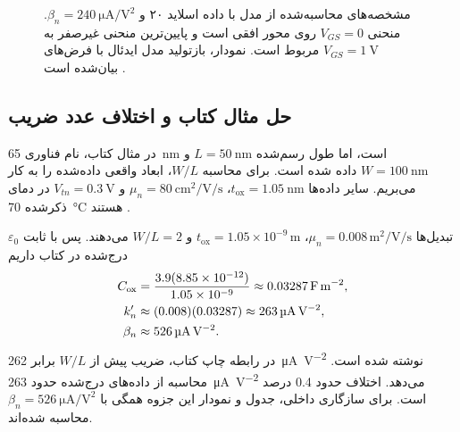 \begin{figure}[ht]
\centering
\begin{latin}
\PersianMathDigits
{}
\end{latin}
\caption{مشخصه‌های محاسبه‌شده از مدل  با داده اسلاید ۲۰ و
\(\beta_n=\qty{240}{\micro\ampere\per\volt\squared}\). منحنی \(V_{GS}=0\)
روی محور افقی است و پایین‌ترین منحنی غیرصفر به \(V_{GS}=\qty{1}{\volt}\) مربوط است.
نمودار، بازتولید مدل ایدئال با فرض‌های بیان‌شده است \cite{mos}.}
\label{fig:mos-slide-curves}
\end{figure}

\subsection{حل مثال \texorpdfstring{}{۲.۱} کتاب و اختلاف عدد ضریب}
در مثال  کتاب، نام فناوری \qty{65}{\nano\metre} است، اما طول رسم‌شده
\(L=\qty{50}{\nano\metre}\) و \(W=\qty{100}{\nano\metre}\) داده شده است.
برای محاسبه \(W/L\)، ابعاد واقعی داده‌شده را به کار می‌بریم. سایر داده‌ها
\(t_{\mathrm{ox}}=\qty{1.05}{\nano\metre}\)،
\(\mu_n=\qty{80}{\centi\metre\squared\per\volt\per\second}\) و
\(V_{tn}=\qty{0.3}{\volt}\) در دمای ذکرشده \qty{70}{\degreeCelsius} هستند
\cite[صفحه ۶۷]{weste}.

تبدیل‌ها \(\mu_n=0.008\,\unit{\metre\squared\per\volt\per\second}\)،
\(t_{\mathrm{ox}}=1.05\times10^{-9}\,\unit{\metre}\) و \(W/L=2\) می‌دهند.
پس با ثابت \(\varepsilon_0\) درج‌شده در کتاب داریم
\begin{align}
 C_{\mathrm{ox}}&=\frac{3.9(8.85\times10^{-12})}{1.05\times10^{-9}}
 \approx0.03287\,\unit{\farad\per\metre\squared},\notag\\
 k'_n&\approx(0.008)(0.03287)
 \approx\qty{263}{\micro\ampere\per\volt\squared},\notag\\
 \beta_n&\approx\qty{526}{\micro\ampere\per\volt\squared}.
 \label{eq:mos-book-beta}
\end{align}
در رابطه  چاپ کتاب، ضریب پیش از \(W/L\) برابر
\qty{262}{\micro\ampere\per\volt\squared} نوشته شده است.
محاسبه از داده‌های درج‌شده حدود \qty{263}{\micro\ampere\per\volt\squared}
می‌دهد. اختلاف حدود \num{0.4} درصد است. برای سازگاری داخلی، جدول و نمودار این جزوه
همگی با \(\beta_n=\qty{526}{\micro\ampere\per\volt\squared}\) محاسبه شده‌اند.

